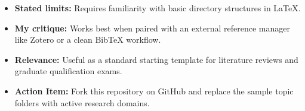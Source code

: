 
\loglimitations
\begin{itemize}
    \item \textbf{Stated limits:} Requires familiarity with basic directory structures in LaTeX.
    \item \textbf{My critique:} Works best when paired with an external reference manager like Zotero or a clean BibTeX workflow.
\end{itemize}



\logtakeaways
\begin{itemize}
    \item \textbf{Relevance:} Useful as a standard starting template for literature reviews and graduate qualification exams.
    \item \textbf{Action Item:} Fork this repository on GitHub and replace the sample topic folders with active research domains.
\end{itemize}